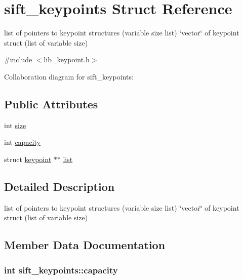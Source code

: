 \hypertarget{structsift__keypoints}{}\section{sift\+\_\+keypoints Struct Reference}
\label{structsift__keypoints}


list of pointers to keypoint structures (variable size list) \char`\"{}vector\char`\"{} of keypoint struct (list of variable size)  




{\ttfamily \#include $<$lib\+\_\+keypoint.\+h$>$}



Collaboration diagram for sift\+\_\+keypoints\+:
\subsection*{Public Attributes}
\begin{DoxyCompactItemize}
\item 
int \hyperlink{structsift__keypoints_a41f37d9e8c97c414865381920c277b36}{size}
\item 
int \hyperlink{structsift__keypoints_a1dac356d1c1ffce93895da6c9bbdf960}{capacity}
\item 
struct \hyperlink{structkeypoint}{keypoint} $\ast$$\ast$ \hyperlink{structsift__keypoints_af36e8401081943dce149df4d9b655ba3}{list}
\end{DoxyCompactItemize}


\subsection{Detailed Description}
list of pointers to keypoint structures (variable size list) \char`\"{}vector\char`\"{} of keypoint struct (list of variable size) 

\subsection{Member Data Documentation}
\hypertarget{structsift__keypoints_a1dac356d1c1ffce93895da6c9bbdf960}{}
\subsubsection[{capacity}]{\setlength{\rightskip}{0pt plus 5cm}int sift\+\_\+keypoints\+::capacity}\label{structsift__keypoints_a1dac356d1c1ffce93895da6c9bbdf960}
\hypertarget{structsift__keypoints_af36e8401081943dce149df4d9b655ba3}{}
